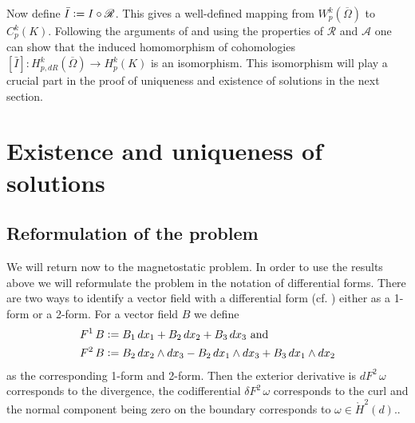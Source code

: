 \documentclass[12pt,a4paper]{article}
\theoremstyle{definition}
\newcommand{\aop}{\mathscr{A}}
\newcommand{\omegabar}{\overline{\Omega}}
\newcommand{\rop}{\mathscr{R}} %
\begin{document}
Now define $\bar{I} \vcentcolon= I \circ \rop$. This gives a well-defined 
mapping from $W^k_p(\omegabar)$ to $C^k_p(K)$. Following the arguments of 
\cite{goldshtein} and using the properties of $\rop$ and $\aop$ one can show 
that the induced homomorphism of cohomologies 
$[\bar{I}]: H^k_{p,dR}(\omegabar) \rightarrow H^k_p(K)$ is an isomorphism.
This isomorphism will play a crucial part in the proof of uniqueness and 
existence of solutions in the next section.


\section{Existence and uniqueness of solutions}

\subsection{Reformulation of the problem} 

We will return now to the magnetostatic problem. In order to use the results
above we will reformulate the problem in the notation of differential forms.
There are two ways to identify a vector field with a differential form 
(cf. \cite[Table 6.1 and p.70]{arnold}) either as a 1-form or a 2-form. 
For a vector field $B$ we define
\begin{align*}
    F^1\, B &\vcentcolon= B_1 \, dx_1 + B_2 \, dx_2 + B_3\, dx_3 \text{ and}\\
    F^2\, B &\vcentcolon= B_2 \, dx_2 \wedge dx_3 - B_2 \, dx_1 \wedge dx_3
        + B_3 \, dx_1 \wedge dx_2
\end{align*} 
as the corresponding 1-form and 2-form. 
Then the exterior derivative is $dF^2\,\omega$ corresponds to the divergence,
the codifferential $\delta F^2\,\omega$ 
corresponds to the curl and the normal component
being zero on the boundary corresponds 
to $\omega \in \mathring{H}^2(d)$.\cite{}. 
\end{document}
